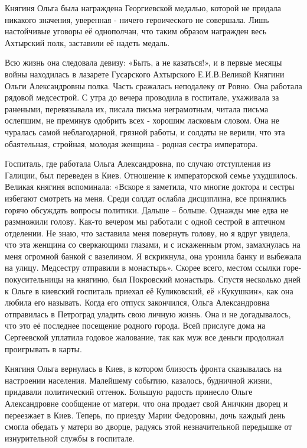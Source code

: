 Княгиня Ольга была награждена Георгиевской медалью, которой не придала никакого
значения, уверенная - ничего героического не совершала. Лишь настойчивые
уговоры её однополчан, что таким образом награжден весь Ахтырский полк,
заставили её надеть медаль. 

Всю жизнь она следовала девизу: «Быть, а не
казаться!», и в первые месяцы войны находилась в лазарете Гусарского Ахтырского
Е.И.В.Великой Княгини Ольги Александровны полка. Часть сражалась неподалеку от
Ровно. Она работала рядовой медсестрой. С утра до вечера проводила в госпитале,
ухаживала за ранеными, перевязывала их, писала письма неграмотным, читала
письма ослепшим, не преминув одобрить всех - хорошим ласковым словом. Она не
чуралась самой неблагодарной, грязной работы, и солдаты не верили, что эта
обаятельная, стройная, молодая женщина - родная сестра императора.

Госпиталь, где работала Ольга Александровна, по случаю отступления из Галиции,
был переведен в Киев. Отношение к императорской семье ухудшилось. Великая
княгиня вспоминала: «Вскоре я заметила, что многие доктора и сестры избегают
смотреть на меня. Среди солдат ослабла дисциплина, все принялись горячо
обсуждать вопросы политики. Дальше – больше. Однажды мне едва не размножили
голову. Как-то вечером мы работали с одной сестрой в аптечном отделении. Не
знаю, что заставила меня повернуть голову, но я вдруг увидела, что эта женщина
со сверкающими глазами, и с искаженным ртом, замахнулась на меня огромной
банкой с вазелином. Я вскрикнула, она уронила банку и выбежала на улицу.
Медсестру отправили в монастырь». Скорее всего, местом ссылки
горе-покусительницы на княгиню, был Покровский монастырь. Спустя несколько дней
к Ольге в киевский госпиталь приехал её Куликовский, её «Кукушкин», как она
любила его называть. Когда его отпуск закончился, Ольга Александровна
отправилась в Петроград уладить свою личную жизнь. Она и не догадывалось, что
это её последнее посещение родного города. Всей прислуге дома на Сергеевской
уплатила годовое жалование, так как муж все деньги продолжал проигрывать в
карты.

Княгиня Ольга вернулась в Киев, в котором близость фронта сказывалась на
настроении населения. Малейшему событию, казалось, будничной жизни, придавали
политический оттенок. Большую радость принесло Ольге Александровне сообщение от
матери, что она продает свой Аничкин дворец и переезжает в Киев. Теперь, по
приезду Марии Федоровны, дочь каждый день смогла обедать у матери во дворце,
радуясь этой незначительной передышке от изнурительной службы в госпитале. 

